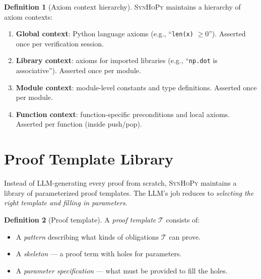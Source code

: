 \documentclass[11pt,a4paper]{report}
\theoremstyle{definition}
\newtheorem{definition}{Definition}[chapter]
\theoremstyle{plain}
\newcommand{\synhopy}{\textsc{SynHoPy}}
\begin{document}
\begin{definition}[Axiom context hierarchy]
\synhopy{} maintains a hierarchy of axiom contexts:
\begin{enumerate}
  \item \textbf{Global context}: Python language axioms (e.g., ``\lstinline[style=python]{len(x)} $\geq 0$'').
    Asserted once per verification session.
  \item \textbf{Library context}: axioms for imported libraries (e.g., ``\lstinline[style=python]{np.dot} is
    associative'').  Asserted once per module.
  \item \textbf{Module context}: module-level constants and type definitions.
    Asserted once per module.
  \item \textbf{Function context}: function-specific preconditions and local axioms.
    Asserted per function (inside push/pop).
\end{enumerate}
\end{definition}


\section{Proof Template Library}
\label{sec:proof-templates}

Instead of LLM-generating every proof from scratch, \synhopy{} maintains a
library of parameterized proof templates.  The LLM's job reduces to
\emph{selecting the right template and filling in parameters}.

\begin{definition}[Proof template]
A \emph{proof template} $\mathcal{T}$ consists of:
\begin{itemize}
  \item A \emph{pattern} describing what kinds of obligations $\mathcal{T}$ can prove.
  \item A \emph{skeleton} --- a proof term with holes for parameters.
  \item A \emph{parameter specification} --- what must be provided to fill the holes.
\end{itemize}
\end{definition}
\end{document}
